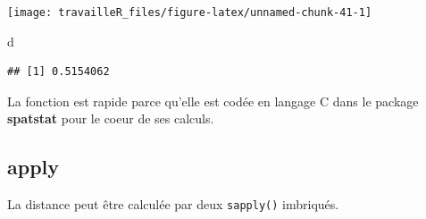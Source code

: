 \documentclass[
  12pt,
  french,
  a4paper,
  extrafontsizes,onecolumn,openright
  ]{memoir}
\newenvironment{Shaded}{\begin{snugshade}}{\end{snugshade}}
\newcommand{\ControlFlowTok}[1]{\textcolor[rgb]{0.13,0.29,0.53}{\textbf{#1}}}
\newcommand{\DecValTok}[1]{\textcolor[rgb]{0.00,0.00,0.81}{#1}}
\newcommand{\KeywordTok}[1]{\textcolor[rgb]{0.13,0.29,0.53}{\textbf{#1}}}
\newcommand{\NormalTok}[1]{#1}
\newcommand{\OperatorTok}[1]{\textcolor[rgb]{0.81,0.36,0.00}{\textbf{#1}}}
\newcommand{\StringTok}[1]{\textcolor[rgb]{0.31,0.60,0.02}{#1}}
\begin{document}
\begin{center}\texttt{[image: travailleR\_files/figure-latex/unnamed-chunk-41-1]} \end{center}

\begin{Shaded}
\begin{Highlighting}[]
\NormalTok{d}
\end{Highlighting}
\end{Shaded}

\begin{verbatim}
## [1] 0.5154062
\end{verbatim}

\normalsize

La fonction est rapide parce qu'elle est codée en langage C dans le package \textbf{spatstat} pour le coeur de ses calculs.

\hypertarget{apply}{%
\subsection{apply}\label{apply}}

La distance peut être calculée par deux \texttt{sapply()} imbriqués.

\scriptsize

\begin{Shaded}
\end{Shaded}
\end{document}

